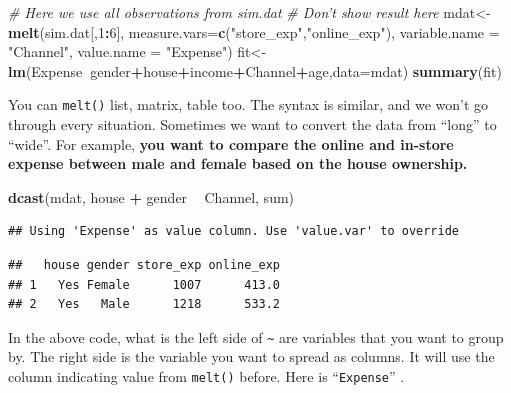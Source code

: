 \documentclass[12pt,]{krantz}
\newenvironment{Shaded}{\begin{snugshade}}{\end{snugshade}}
\newcommand{\KeywordTok}[1]{\textcolor[rgb]{0.13,0.29,0.53}{\textbf{#1}}}
\newcommand{\DataTypeTok}[1]{\textcolor[rgb]{0.13,0.29,0.53}{#1}}
\newcommand{\DecValTok}[1]{\textcolor[rgb]{0.00,0.00,0.81}{#1}}
\newcommand{\StringTok}[1]{\textcolor[rgb]{0.31,0.60,0.02}{#1}}
\newcommand{\CommentTok}[1]{\textcolor[rgb]{0.56,0.35,0.01}{\textit{#1}}}
\newcommand{\OperatorTok}[1]{\textcolor[rgb]{0.81,0.36,0.00}{\textbf{#1}}}
\newcommand{\NormalTok}[1]{#1}
\theoremstyle{definition}
\theoremstyle{definition}
\theoremstyle{definition}
\theoremstyle{remark}
\begin{document}
\begin{Shaded}
\begin{Highlighting}[]
\CommentTok{# Here we use all observations from sim.dat}
\CommentTok{# Don't show result here}
\NormalTok{mdat<-}\KeywordTok{melt}\NormalTok{(sim.dat[,}\DecValTok{1}\OperatorTok{:}\DecValTok{6}\NormalTok{], }\DataTypeTok{measure.vars=}\KeywordTok{c}\NormalTok{(}\StringTok{"store_exp"}\NormalTok{,}\StringTok{"online_exp"}\NormalTok{),}
            \DataTypeTok{variable.name =} \StringTok{"Channel"}\NormalTok{,}
              \DataTypeTok{value.name =} \StringTok{"Expense"}\NormalTok{)}
\NormalTok{fit<-}\KeywordTok{lm}\NormalTok{(Expense}\OperatorTok{~}\NormalTok{gender}\OperatorTok{+}\NormalTok{house}\OperatorTok{+}\NormalTok{income}\OperatorTok{+}\NormalTok{Channel}\OperatorTok{+}\NormalTok{age,}\DataTypeTok{data=}\NormalTok{mdat)}
\KeywordTok{summary}\NormalTok{(fit)}
\end{Highlighting}
\end{Shaded}

You can \texttt{melt()} list, matrix, table too. The syntax is similar,
and we won't go through every situation. Sometimes we want to convert
the data from ``long'' to ``wide''. For example, \textbf{you want to
compare the online and in-store expense between male and female based on
the house ownership. }

\begin{Shaded}
\begin{Highlighting}[]
\KeywordTok{dcast}\NormalTok{(mdat, house }\OperatorTok{+}\StringTok{ }\NormalTok{gender }\OperatorTok{~}\StringTok{ }\NormalTok{Channel, sum)}
\end{Highlighting}
\end{Shaded}

\begin{verbatim}
## Using 'Expense' as value column. Use 'value.var' to override
\end{verbatim}

\begin{verbatim}
##   house gender store_exp online_exp
## 1   Yes Female      1007      413.0
## 2   Yes   Male      1218      533.2
\end{verbatim}

In the above code, what is the left side of \texttt{\textasciitilde{}}
are variables that you want to group by. The right side is the variable
you want to spread as columns. It will use the column indicating value
from \texttt{melt()} before. Here is ``\texttt{Expense}'' .
\end{document}
